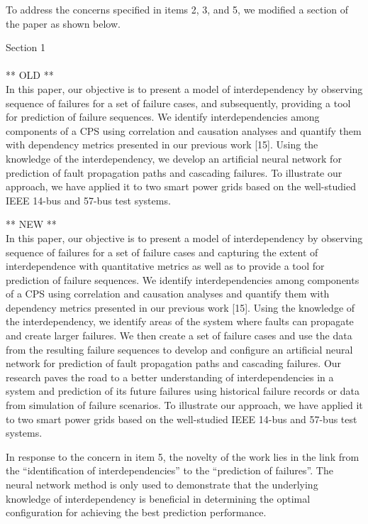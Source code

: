\documentclass{article}
\newenvironment{response}{
  \doublespacing
  \setlength\parindent{0.05\linewidth}
  \ttfamily
}{}
\newenvironment{textblock}[1]
{\begin{tcolorbox}[breakable,enhanced]{#1 \\ \\}}
{\end{tcolorbox}}
\begin{document}
\begin{response}
To address the concerns specified in items 2, 3, and 5, we modified a section of the paper as shown below.

\begin{textblock}{Section 1}
** OLD **\\
In this paper, our objective is to present a model of interdependency by observing sequence of failures for a set of failure cases, and subsequently, providing a tool for prediction of failure sequences. We identify interdependencies among components of a CPS using correlation and causation analyses and quantify them with dependency metrics presented in our previous work [15]. Using the knowledge of the interdependency, we develop an artificial neural network for prediction of fault propagation paths and cascading failures. To illustrate our approach, we have applied it to two smart power grids based on the well-studied IEEE 14-bus and 57-bus test systems.

\vspace{1em}
** NEW **\\
In this paper, our objective is to present a model of interdependency by observing sequence of failures for a set of failure cases and capturing the extent of interdependence with quantitative metrics as well as to provide a tool for prediction of failure sequences. We identify interdependencies among components of a CPS using correlation and causation analyses and quantify them with dependency metrics presented in our previous work [15]. Using the knowledge of the interdependency, we identify areas of the system where faults can propagate and create larger failures. We then create a set of failure cases and use the data from the resulting failure sequences to develop and configure an artificial neural network for prediction of fault propagation paths and cascading failures. Our research paves the road to a better understanding of interdependencies in a system and prediction of its future failures using historical failure records or data from simulation of failure scenarios. To illustrate our approach, we have applied it to two smart power grids based on the well-studied IEEE 14-bus and 57-bus test systems.
\end{textblock}

In response to the concern in item 5, the novelty of the work lies in the link from the ``identification of interdependencies'' to the ``prediction of failures''. The neural network method is only used to demonstrate that the underlying knowledge of interdependency is beneficial in determining the optimal configuration for achieving the best prediction performance.


\end{response}
\end{document}
